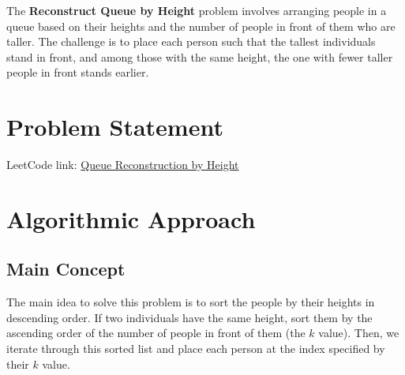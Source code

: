 
\label{problem:reconstruct_queue_by_height}

The \textbf{Reconstruct Queue by Height} problem involves arranging people in a queue based on their heights and the number of people in front of them who are taller. The challenge is to place each person such that the tallest individuals stand in front, and among those with the same height, the one with fewer taller people in front stands earlier.

\section*{Problem Statement}

LeetCode link: \href{https://leetcode.com/problems/queue-reconstruction-by-height/}{Queue Reconstruction by Height}


\section*{Algorithmic Approach}

\subsection*{Main Concept}
The main idea to solve this problem is to sort the people by their heights in descending order. If two individuals have the same height, sort them by the ascending order of the number of people in front of them (the \( k \) value). Then, we iterate through this sorted list and place each person at the index specified by their \( k \) value.

